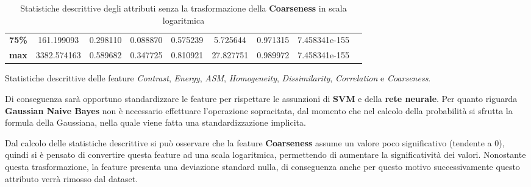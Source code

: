 \begin{table}[!ht]
\begin{subtable}[h]{1\textwidth}
{\begin{tabular}{c|c c c c c c c c}
                        \textbf{75\%}                                             & 161.199093        & 0.298110        & 0.088870     & 0.575239             & 5.725644               & 0.971315             & 7.458341e-155       \\
                        \textbf{max}                                              & 3382.574163       & 0.589682        & 0.347725     & 0.810921             & 27.827751              & 0.989972             & 7.458341e-155       \\ \hline
                  \end{tabular}}
            \caption{Statistiche descrittive delle feature \textit{Contrast}, \textit{Energy}, \textit{ASM}, \textit{Homogeneity}, \textit{Dissimilarity}, \textit{Correlation} e \textit{Coarseness}.}
            \label{tab:secondameta}
      \end{subtable}
      \caption{Statistiche descrittive degli attributi senza la trasformazione 
      della \textbf{Coarseness} in scala logaritmica}
      \label{tab:desc-stat}
\end{table}
\newpage
Di conseguenza sarà opportuno standardizzare le feature per rispettare le
assunzioni di \textbf{SVM} e della \textbf{rete neurale}. Per quanto riguarda
\textbf{Gaussian Naive Bayes} non è necessario effettuare l'operazione
sopracitata, dal momento che nel calcolo della probabilità si sfrutta la formula
della Gaussiana, nella quale viene fatta una standardizzazione implicita.

Dal calcolo delle statistiche descrittive si può osservare che la feature
\textbf{Coarseness} assume un valore poco significativo (tendente a $0$), quindi
si è pensato di convertire questa feature ad una scala logaritmica, permettendo
di aumentare la significatività dei valori. Nonostante questa trasformazione,
la feature presenta una deviazione standard nulla, di conseguenza anche per 
questo motivo successivamente questo attributo verrà rimosso dal dataset.

